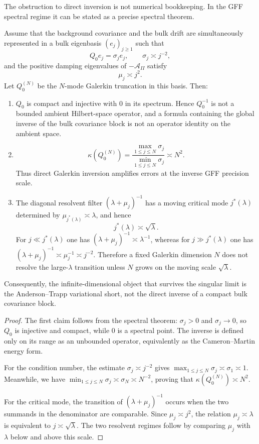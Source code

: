 The obstruction to direct inversion is not numerical bookkeeping.  In the GFF
spectral regime it can be stated as a precise spectral theorem.

\begin{lemma}
\label{lem:gff_spectral_obstruction_appendix}
Assume that the background covariance and the bulk drift are simultaneously
represented in a bulk eigenbasis $(e_j)_{j\ge1}$ such that
\[
  Q_0e_j=\sigma_je_j,
  \qquad
  \sigma_j\asymp j^{-2},
\]
and the positive damping eigenvalues of $-\mathcal{A}_{II}$ satisfy
\[
  \mu_j\asymp j^2 .
\]
Let $Q_0^{(N)}$ be the $N$-mode Galerkin truncation in this basis.  Then:
\begin{enumerate}[label=(\roman*)]
\item $Q_0$ is compact and injective with $0$ in its spectrum.  Hence
$Q_0^{-1}$ is not a bounded ambient Hilbert-space operator, and a formula
containing the global inverse of the bulk covariance block is not an operator
identity on the ambient space.
\item
\[
  \kappa(Q_0^{(N)})
  =
  \frac{\max_{1\le j\le N}\sigma_j}{\min_{1\le j\le N}\sigma_j}
  \asymp N^2 .
\]
Thus direct Galerkin inversion amplifies errors at the inverse GFF precision
scale.
\item The diagonal resolvent filter $(\lambda+\mu_j)^{-1}$ has a moving critical
mode $j^*(\lambda)$ determined by $\mu_{j^*(\lambda)}\asymp\lambda$, and hence
\[
  j^*(\lambda)\asymp\sqrt{\lambda}.
\]
For $j\ll j^*(\lambda)$ one has
$(\lambda+\mu_j)^{-1}\asymp\lambda^{-1}$, whereas for
$j\gg j^*(\lambda)$ one has
$(\lambda+\mu_j)^{-1}\asymp\mu_j^{-1}\asymp j^{-2}$.  Therefore a fixed
Galerkin dimension $N$ does not resolve the large-$\lambda$ transition unless
$N$ grows on the moving scale $\sqrt{\lambda}$.
\end{enumerate}
Consequently, the infinite-dimensional object that survives the singular limit
is the Anderson--Trapp variational short, not the direct inverse of a compact
bulk covariance block.
\end{lemma}

\begin{proof}
The first claim follows from the spectral theorem: $\sigma_j>0$ and
$\sigma_j\to0$, so $Q_0$ is injective and compact, while $0$ is a spectral point.
The inverse is defined only on its range as an unbounded operator, equivalently
as the Cameron--Martin energy form.

For the condition number, the estimate $\sigma_j\asymp j^{-2}$ gives
$\max_{1\le j\le N}\sigma_j\asymp\sigma_1\asymp1$. Meanwhile, we have
$\min_{1\le j\le N}\sigma_j\asymp\sigma_N\asymp N^{-2}$, proving that
$\kappa(Q_0^{(N)})\asymp N^2$.

For the critical mode, the transition of $(\lambda+\mu_j)^{-1}$ occurs when the
two summands in the denominator are comparable.  Since $\mu_j\asymp j^2$, the
relation $\mu_j\asymp\lambda$ is equivalent to $j\asymp\sqrt{\lambda}$.  The two
resolvent regimes follow by comparing $\mu_j$ with $\lambda$ below and above this
scale.
\end{proof}

